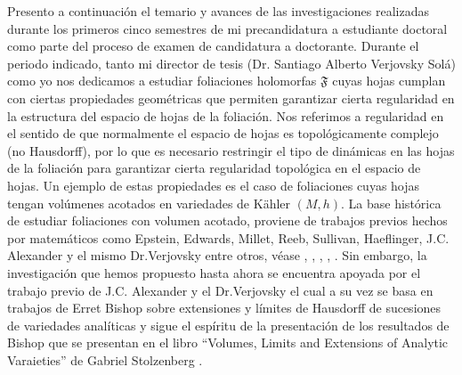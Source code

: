 \documentclass[letterpaper]{report}
\begin{document}
\noindent Presento a continuaci\'on el temario y avances de las investigaciones realizadas durante los primeros cinco semestres 
de mi precandidatura a estudiante doctoral como parte del proceso de examen de candidatura a doctorante.
Durante el periodo indicado, tanto mi director de tesis (Dr. Santiago Alberto Verjovsky Sol\'a) como yo nos dedicamos a estudiar 
foliaciones holomorfas $\mathfrak{F}$ cuyas hojas cumplan con ciertas propiedades geom\'etricas que permiten garantizar cierta regularidad en 
la estructura del espacio de hojas de la foliaci\'on. Nos referimos a regularidad en el sentido de que normalmente el 
espacio de hojas es topol\'ogicamente complejo (no Hausdorff), por lo que es necesario restringir el tipo de din\'amicas en las hojas 
de la foliaci\'on para garantizar cierta regularidad topol\'ogica en el espacio de hojas. Un ejemplo de estas propiedades es el caso de foliaciones cuyas hojas tengan 
vol\'umenes acotados en variedades de K\"ahler $(M,h)$. 
La base hist\'orica de estudiar foliaciones con volumen acotado, proviene de trabajos previos hechos por matem\'aticos como
Epstein, Edwards, Millet, Reeb, Sullivan, Haeflinger, J.C. Alexander y el mismo Dr.Verjovsky entre otros, v\'ease \cite{Epstein1}, \cite{Epstein2}, \cite{EMS}, \cite{E-V}, \cite{V-A}. 
Sin embargo, la investigaci\'on que hemos propuesto hasta ahora se encuentra apoyada por el trabajo previo de J.C. Alexander y el 
Dr.Verjovsky \cite{V-A} el cual a su vez se basa en trabajos de Erret Bishop \cite{Bishop} sobre extensiones y l\'imites de Hausdorff 
de sucesiones de variedades anal\'iticas y sigue el esp\'iritu de la presentaci\'on de los resultados de Bishop que se presentan en el 
libro ``Volumes, Limits and Extensions of Analytic Varaieties'' de Gabriel Stolzenberg \cite{Stolzenberg}.
\end{document}
